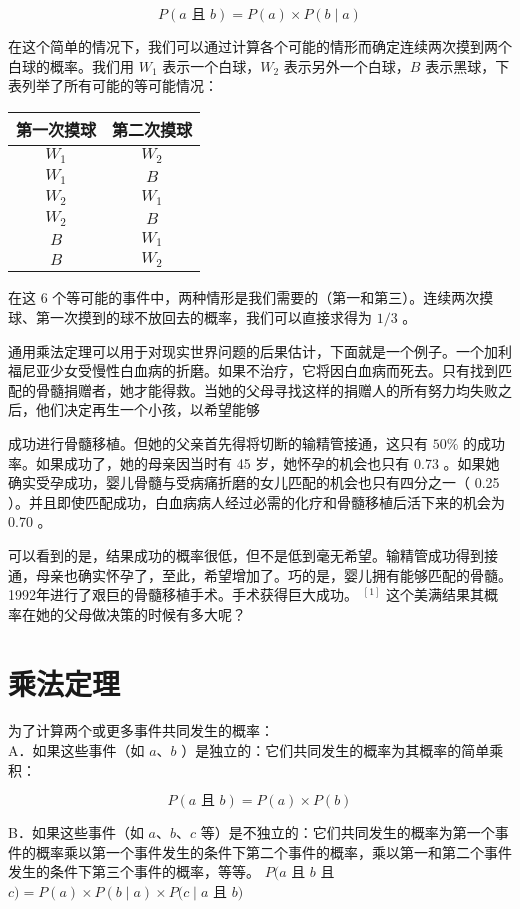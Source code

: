 $$
P(a \text { 且 } b)=P(a) \times P(b \mid a)
$$

在这个简单的情况下，我们可以通过计算各个可能的情形而确定连续两次摸到两个白球的概率。我们用 $W_{1}$ 表示一个白球，$W_{2}$ 表示另外一个白球，$B$ 表示黑球，下表列举了所有可能的等可能情况：

\begin{center}
\begin{tabular}{|cc|}
\hline
第一次摸球 & 第二次摸球 \\
\hline
$W_{1}$ & $W_{2}$ \\
$W_{1}$ & $B$ \\
$W_{2}$ & $W_{1}$ \\
$W_{2}$ & $B$ \\
$B$ & $W_{1}$ \\
$B$ & $W_{2}$ \\
\hline
\end{tabular}
\end{center}

在这 6 个等可能的事件中，两种情形是我们需要的（第一和第三）。连续两次摸球、第一次摸到的球不放回去的概率，我们可以直接求得为 $1 / 3$ 。

通用乘法定理可以用于对现实世界问题的后果估计，下面就是一个例子。一个加利福尼亚少女受慢性白血病的折磨。如果不治疗，它将因白血病而死去。只有找到匹配的骨髓捐赠者，她才能得救。当她的父母寻找这样的捐赠人的所有努力均失败之后，他们决定再生一个小孩，以希望能够

成功进行骨髓移植。但她的父亲首先得将切断的输精管接通，这只有 $50 \%$ 的成功率。如果成功了，她的母亲因当时有 45 岁，她怀孕的机会也只有 0.73 。如果她确实受孕成功，婴儿骨髓与受病痛折磨的女儿匹配的机会也只有四分之一（ 0.25 ）。并且即使匹配成功，白血病病人经过必需的化疗和骨髓移植后活下来的机会为 0.70 。

可以看到的是，结果成功的概率很低，但不是低到毫无希望。输精管成功得到接通，母亲也确实怀孕了，至此，希望增加了。巧的是，婴儿拥有能够匹配的骨髓。1992年进行了艰巨的骨髓移植手术。手术获得巨大成功。 ${ }^{[1]}$ 这个美满结果其概率在她的父母做决策的时候有多大呢？

\section*{乘法定理}
为了计算两个或更多事件共同发生的概率：\\
A．如果这些事件（如 $a 、 b$ ）是独立的：它们共同发生的概率为其概率的简单乘积：

$$
P(a \text { 且 } b)=P(a) \times P(b)
$$

B．如果这些事件（如 $a 、 b 、 c$ 等）是不独立的：它们共同发生的概率为第一个事件的概率乘以第一个事件发生的条件下第二个事件的概率，乘以第一和第二个事件发生的条件下第三个事件的概率，等等。 $P(a$ 且 $b$ 且 $c)=P(a) \times P(b \mid a) \times P(c \mid a$ 且 $b)$

